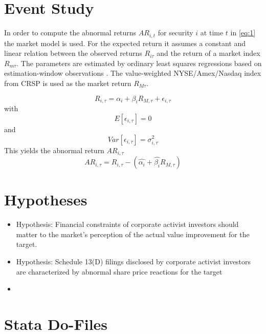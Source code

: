 \documentclass[12pt]{article}
\begin{document}
\begin{appendices}
\section{Event Study}

\noindent In order to compute the abnormal returns $AR_{i,t}$ for security $i$ at time $t$ in \eqref{eq:1} the market model is used. For the expected return it assumes a constant and linear relation between the observed returns $R_{i\tau}$ and the return of a market index $R_{m\tau}$. The parameters are estimated by ordinary least squares regressions based on estimation-window observations \citep[p.210]{Corrado2011}. The value-weighted NYSE/Amex/Nasdaq index from CRSP is used as the market return $R_{M\tau}$.

			\begin{equation*}
				R_{i,\tau}=\alpha_{i}+\beta_{i}R_{M,\tau}+\epsilon_{i,\tau}
			\end{equation*}
			with 
			\begin{equation*}
				E[\epsilon_{i,\tau}]=0
			\end{equation*}
			and 
			\begin{equation*}
				Var[\epsilon_{i,\tau}]=\sigma^2_{i,\tau}
			\end{equation*}
			This yields the abnormal return $AR_{i,\tau}$
			\begin{equation}
				AR_{i,\tau}=R_{i,\tau}-(\hat{\alpha_{i}}+\hat{\beta_{i}}R_{M,\tau})
			\end{equation}

\section{Hypotheses}

\begin{itemize}
\renewcommand\labelitemi{}
	\item {} Hypothesis: Financial constraints of corporate activist investors should matter to the market's perception of the actual value improvement for the target.
	\item {} Hypothesis: Schedule 13(D) filings disclosed by corporate activist investors are characterized by abnormal share price reactions for the target
	\item {}
\end{itemize}

\section{Stata Do-Files}
\end{appendices}
\end{document}
